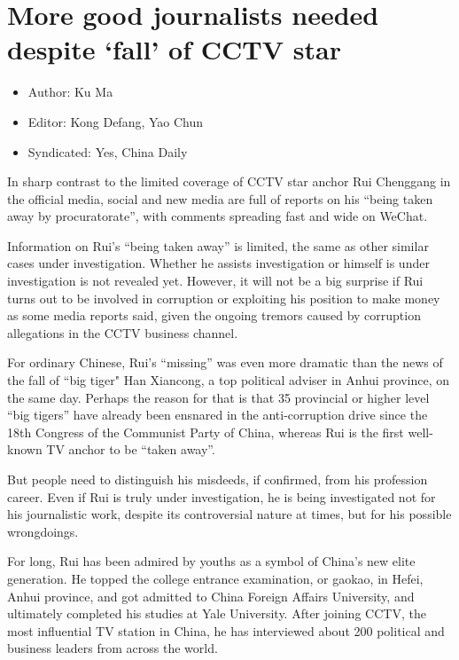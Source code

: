 \section{More good journalists needed despite `fall' of CCTV star}

\begin{itemize}
	\item Author: Ku Ma
	\item Editor: Kong Defang, Yao Chun
	\item Syndicated: Yes, China Daily
\end{itemize}

\begin{displayquote}

	In sharp contrast to the limited coverage of CCTV star anchor Rui
	Chenggang in the official media, social and new media are full of
	reports on his ``being taken away by procuratorate'', with comments
	spreading fast and wide on WeChat.

	Information on Rui's ``being taken away'' is limited, the same as other
	similar cases under investigation. Whether he assists investigation or
	himself is under investigation is not revealed yet. However, it will not
	be a big surprise if Rui turns out to be involved in corruption or
	exploiting his position to make money as some media reports said, given
	the ongoing tremors caused by corruption allegations in the CCTV
	business channel.

	For ordinary Chinese, Rui's ``missing'' was even more dramatic than the
	news of the fall of ``big tiger" Han Xiancong, a top political adviser
	in Anhui province, on the same day. Perhaps the reason for that is that
	35 provincial or higher level ``big tigers'' have already been ensnared
	in the anti-corruption drive since the 18th Congress of the Communist
	Party of China, whereas Rui is the first well-known TV anchor to be
	``taken away''.

	But people need to distinguish his misdeeds, if confirmed, from his
	profession career. Even if Rui is truly under investigation, he is being
	investigated not for his journalistic work, despite its controversial
	nature at times, but for his possible wrongdoings.

	For long, Rui has been admired by youths as a symbol of China's new
	elite generation. He topped the college entrance examination, or gaokao,
	in Hefei, Anhui province, and got admitted to China Foreign Affairs
	University, and ultimately completed his studies at Yale University.
	After joining CCTV, the most influential TV station in China, he has
	interviewed about 200 political and business leaders from across the
	world.


\end{displayquote}
